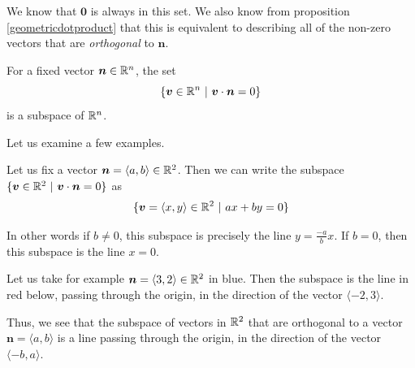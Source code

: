 We know that $\bm{0}$ is always in this set.  We also know from proposition \ref{geometricdotproduct} that this is equivalent to describing all of the non-zero vectors that are \textit{orthogonal} to $\bm{n}$. 

\begin{proposition}
    For a fixed vector $\bm{n} \in \mathbb{R}^n$, the set 
    $$\{\bm{v} \in \mathbb{R}^n \ | \ \bm{v} \cdot \bm{n} = 0\}$$ is a subspace of $\mathbb{R}^n$.
\end{proposition}


Let us examine a few examples.

\begin{example}
    Let us fix a vector $\bm{n} = \langle a, b\rangle \in \mathbb{R}^2$.  Then we can write the subspace $\{\bm{v} \in \mathbb{R}^2 \ | \ \bm{v} \cdot \bm{n} = 0\}$ as
    $$\{\bm{v} = \langle x, y \rangle \in \mathbb{R}^2 \ | \ ax+by = 0\}$$
    
    In other words if $b\neq0$, this subspace is precisely the line $y = \frac{-a}{b}x$.  If $b=0$, then this subspace is the line $x=0$.
    
    Let us take for example $\bm{n} = \langle 3, 2\rangle \in \mathbb{R}^2$ in blue. Then the subspace is the line in red below, passing through the origin, in the direction of the vector $\langle-2, 3\rangle$.
    
    \begin{center}
        \end{center}
\end{example}

Thus, we see that the subspace of vectors in $\mathbb{R}^2$ that are orthogonal to a vector $\bm{n} = \langle a, b \rangle$ is a line passing through the origin, in the direction of the vector $\langle -b, a \rangle$.

